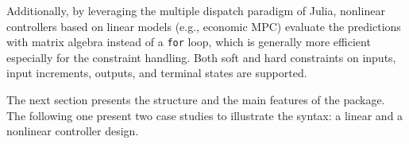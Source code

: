 Additionally, by leveraging the multiple dispatch paradigm of Julia, nonlinear controllers based on linear models (e.g., economic MPC) evaluate the predictions with matrix algebra instead of a \texttt{for} loop, which is generally more efficient especially for the constraint handling.  Both soft and hard constraints on inputs, input increments, outputs, and terminal states are supported. 

The next section presents the structure and the main features of the package. The following one present two case studies to illustrate the syntax: a linear and a nonlinear controller design.